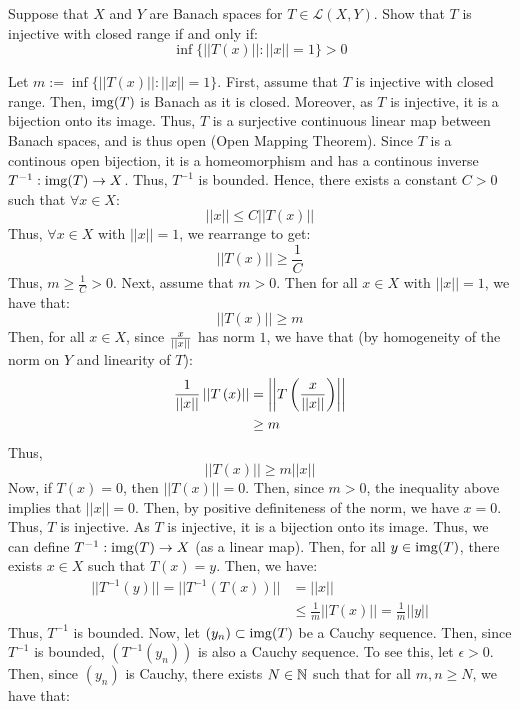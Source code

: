 \documentclass[12pt]{article}
\begin{document}
\begin{problem}{35}
    Suppose that $X$ and $Y$ are Banach spaces for $T \in \mathcal{L}(X, Y)$. Show that $T$ is injective with closed range if and only if: 
    \[ \inf \{||T(x)|| : ||x|| = 1\} > 0 \]
\end{problem}
\begin{solution} 
    Let $m := \inf \{||T(x)|| : ||x|| = 1\}$. \bbni
    First, assume that $T$ is injective with closed range. Then, $\operatorname{img}(T)$ is Banach as it is closed. Moreover, as $T$ is injective, it is a bijection onto its image. Thus, $T$ is a surjective continuous linear map between Banach spaces, and is thus open (Open Mapping Theorem). Since $T$ is a continous open bijection, it is a homeomorphism and has a continous inverse $T^{-1}: \operatorname{img}(T) \to X$. Thus, $T^{-1}$ is bounded. Hence, there exists a constant $C > 0$ such that $\forall x \in X$:
    \[ ||x|| \leq C||T(x)||\]
    Thus, $\forall x \in X$ with $||x|| = 1$, we rearrange to get:
    \[ ||T(x)|| \geq \frac{1}{C}\]
    Thus, $m \geq \frac{1}{C} > 0$. \bbni
    Next, assume that $m > 0$. Then for all $x \in X$ with $||x|| = 1$, we have that: 
    \[ ||T(x)|| \geq m\]
    Then, for all $x \in X$, since $\frac{x}{\left\vert\left\vert x\right\vert\right\vert}$ has norm $1$, we have that (by homogeneity of the norm on $Y$ and linearity of $T$): 
    \begin{align*}
        \frac{1}{\left\vert\left\vert x\right\vert\right\vert}\left\vert\left\vert T\left(x\right)\right\vert\right\vert &= \left\vert\left\vert T\left(\frac{x}{\left\vert\left\vert x\right\vert\right\vert}\right)\right\vert\right\vert \\
        &\geq m 
    \end{align*}   
    Thus, 
    \[||T(x)|| \geq m||x||\]  
    Now, if $T(x) = 0$, then $||T(x)|| = 0$. Then, since $m > 0$, the inequality above implies that $||x|| = 0$. Then, by positive definiteness of the norm, we have $x = 0$. Thus, $T$ is injective. \bbni
    As $T$ is injective, it is a bijection onto its image. Thus, we can define $T^{-1}: \operatorname{img}(T) \to X$ (as a linear map). Then, for all $y \in \operatorname{img}(T)$, there exists $x \in X$ such that $T(x) = y$. Then, we have: 
    \begin{align*}
        ||T^{-1}(y)|| = ||T^{-1}(T(x))|| &= ||x|| \\
        &\leq \frac{1}{m} ||T(x)|| = \frac{1}{m} ||y||
    \end{align*}
    Thus, $T^{-1}$ is bounded. \bbni
    Now, let $(y_n) \subset \operatorname{img}(T)$ be a Cauchy sequence. Then, since $T^{-1}$ is bounded, $(T^{-1}(y_n))$ is also a Cauchy sequence. To see this, let $\epsilon > 0$. Then, since $(y_n)$ is Cauchy, there exists $N \in \mathbb N$ such that for all $m, n \geq N$, we have that: 

\end{solution}
\end{document}
